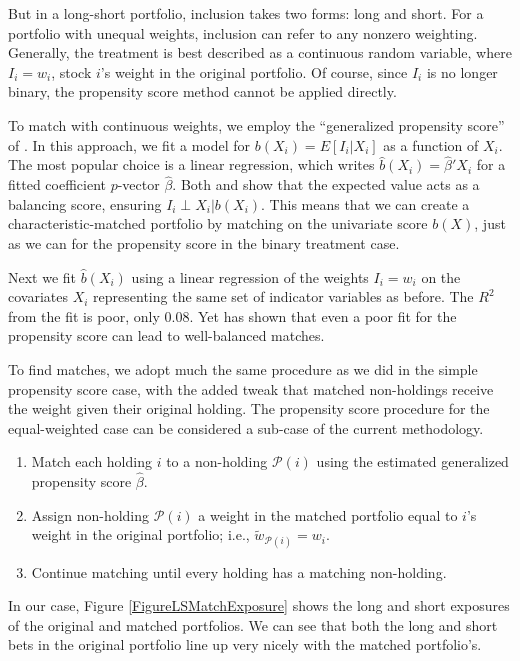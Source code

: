 \documentclass{article}\usepackage{graphicx, color}
\begin{document}
But in a long-short portfolio, inclusion takes two forms: long and
short. For a portfolio with unequal weights, inclusion can refer to
any nonzero weighting. Generally, the treatment is best
described as a continuous random variable, where $I_i = w_i$, stock
$i$'s weight in the original portfolio. Of course, since $I_i$ is no
longer binary, the propensity score method cannot be applied directly.

To match with continuous weights, we employ the ``generalized
propensity score'' of \cite{imai04}. In this approach, we fit a model
for $b(X_i) = E[I_i | X_i]$ as a function of $X_i$. The most popular choice
is a linear regression, which writes $\hat{b}(X_i) = \hat{\beta}' X_i$
for a fitted coefficient $p$-vector $\hat{\beta}$. Both \cite{imai04}
and \cite{hirano04} show that the expected value
acts as a balancing score, ensuring $I_i \perp X_i | b(X_i)$. This
means that we can create a characteristic-matched portfolio by
matching on the univariate score $b(X)$, just as we can for the
propensity score in the binary treatment case.

Next we fit $\hat{b}(X_i)$ using a linear regression of the weights
$I_i = w_i$ on the covariates $X_i$ representing the same set of
indicator variables as before. The $R^2$ from the fit is poor, only
0.08. Yet \cite{lu01} has shown
that even a poor fit for the propensity score can lead to
well-balanced matches.

To find matches, we adopt much the same procedure as we did in the simple
propensity score case, with the added tweak that matched non-holdings
receive the weight given their original holding. The propensity score
procedure for the equal-weighted case can be considered a sub-case of the
current methodology.

\begin{enumerate}
\item Match each holding $i$ to a non-holding $\mathcal{P}(i)$ using the
  estimated generalized propensity score $\hat{\beta}$.
\item Assign non-holding $\mathcal{P}(i)$ a weight in the matched
  portfolio equal to $i$'s weight in the original portfolio; i.e.,
  $\tilde{w}_{\mathcal{P}(i)} = w_i$.
\item Continue matching until every holding has a matching non-holding.
\end{enumerate}

In our case, Figure \ref{FigureLSMatchExposure} shows
the long and short exposures of the original and matched
portfolios. We can see that both the long and short bets in the
original portfolio line up very nicely with the matched portfolio's.
\end{document}
